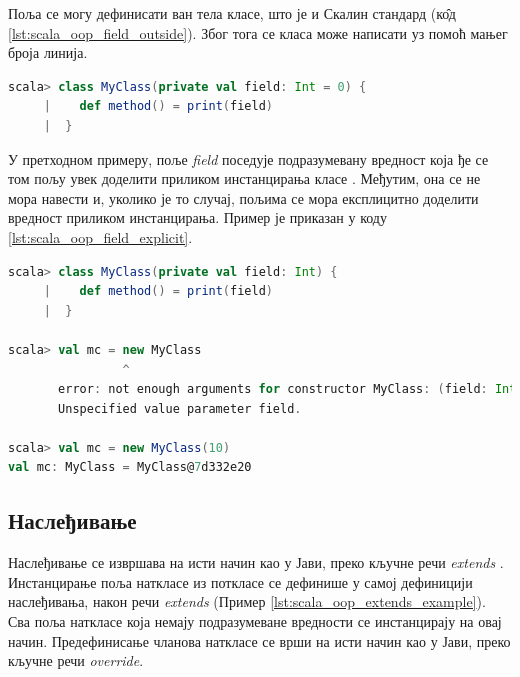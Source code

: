 \documentclass[12pt,oneside]{memoir}
\begin{document}

Поља се могу дефинисати ван тела класе, што је и Скалин стандард (к\^{о}д \ref{lst:scala_oop_field_outside}). Због тога се класа може написати уз помоћ мањег броја линија. 

\begin{lstlisting}[language=Scala, caption={Дефиниција поља ван тела класе}, label={lst:scala_oop_field_outside}, basicstyle=\small]
scala> class MyClass(private val field: Int = 0) {
     |    def method() = print(field)
     |  }

\end{lstlisting}


У претходном примеру, поље \textit{field} поседује подразумевану вредност која ђе се том пољу увек доделити приликом инстанцирања класе \cite{scala_prog}. Међутим, она се не мора навести и, уколико је то случај, пољима се мора експлицитно доделити вредност приликом инстанцирања. Пример је приказан у коду \ref{lst:scala_oop_field_explicit}.

\begin{lstlisting}[language=Scala, caption={Инстанцирање класе без подразумеваних вредности поља}, label={lst:scala_oop_field_explicit}, basicstyle=\small]
scala> class MyClass(private val field: Int) {
     |    def method() = print(field)
     |  }

scala> val mc = new MyClass
                ^
       error: not enough arguments for constructor MyClass: (field: Int): MyClass.
       Unspecified value parameter field.
     
scala> val mc = new MyClass(10)
val mc: MyClass = MyClass@7d332e20
\end{lstlisting}

\subsection{Наслеђивање}
\label{subsec:scala_nasled}

Наслеђивање се извршава на исти начин као у Јави, преко кључне речи \textit{extends} \cite{scala_prog}. Инстанцирање поља наткласе из поткласе се дефинише у самој дефиницији наслеђивања, након речи \textit{extends} (Пример \ref{lst:scala_oop_extends_example}). Сва поља наткласе која немају подразумеване вредности се инстанцирају на овај начин. Предефинисање чланова наткласе се врши на исти начин као у Јави, преко кључне речи \textit{override}.
\end{document}
